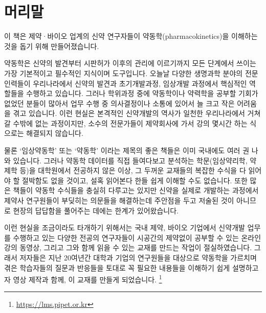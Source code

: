 \documentclass[
  11pt,
  krantz2, a4paper, twoside]{krantz}
\theoremstyle{definition}
\theoremstyle{definition}
\theoremstyle{definition}
\theoremstyle{definition}
\theoremstyle{remark}
\begin{document}
\setlength{\abovedisplayskip}{-5pt}
\setlength{\abovedisplayshortskip}{-5pt}

\newpage\thispagestyle{empty}\null

{
\hypersetup{linkcolor=}
\setcounter{tocdepth}{2}
\tableofcontents
}
\hypertarget{uxba38uxb9acuxb9d0}{%
\chapter*{머리말}\label{uxba38uxb9acuxb9d0}}


\normalsize

이 책은 제약·바이오 업계의 신약 연구자들이 약동학(pharmacokinetics)을 이해하는 것을 돕기 위해 만들어졌습니다.

약동학은 신약의 발견부터 시판허가 이후의 관리에
이르기까지 모든 단계에서 쓰이는 가장 기본적이고 필수적인 지식이며
도구입니다. 오늘날 다양한 생명과학 분야의 전문인력들이 우리나라에서
신약의 발견과 초기개발과정, 임상개발 과정에서 핵심적인 역할들을 수행하고
있습니다. 그러나 학위과정 중에 약동학이나 약력학을 공부할 기회가 없었던
분들이 많아서 업무 수행 중 의사결정이나 소통에 있어서 늘 크고 작은
어려움을 겪고 있습니다. 이런 현실은 본격적인 신약개발의 역사가 일천한
우리나라에서 거쳐갈 수밖에 없는 과정이지만, 소수의 전문가들이 제약회사에
가서 강의 몇시간 하는 식으로는 해결되지 않습니다.

물론 `임상약동학' 또는 `약동학' 이라는 제목의 좋은 책들은 이미 국내에도
여러 권 나와 있습니다. 그러나 약동학 데이터를 직접 들여다보고 분석하는
학문(임상약리학, 약제학 등)을 대학원에서 전공하지 않은 이상, 그 두꺼운
교재들의 복잡한 수식을 다 읽어야 할 절박함도 없을 것이고, 설혹 읽어본다
한들 쉽게 이해할 수도 없습니다. 또한 많은 책들이 약동학 수식들을 충실히
다루고는 있지만 신약을 실제로 개발하는 과정에서 제약사 연구원들이
부딪히는 의문들을 해결하는데 주안점을 두고 저술된 것이 아니므로 현장의
답답함을 풀어주는 데에는 한계가 있어왔습니다.

이런 현실을 조금이라도 타개하기 위해서는 국내 제약, 바이오 기업에서
신약개발 업무를 수행하고 있는 다양한 전공의 연구자들이 시공간의 제약없이
공부할 수 있는 온라인 강의 동영상, 그리고 그와 함께 읽을 수 있는 교재를
만드는 작업이 절실하였습니다. 그래서 저자들은 지난 20여년간 대학과
기업의 연구원들을 대상으로 약동학을 가르치며 겪은 학습자들의 질문과
반응들을 토대로 꼭 필요한 내용들을 이해하기 쉽게 설명하고자 영상 제작과
함께, 이 교재를 만들게 되었습니다. \footnote{\url{https://lms.pipet.or.kr}}
\end{document}
